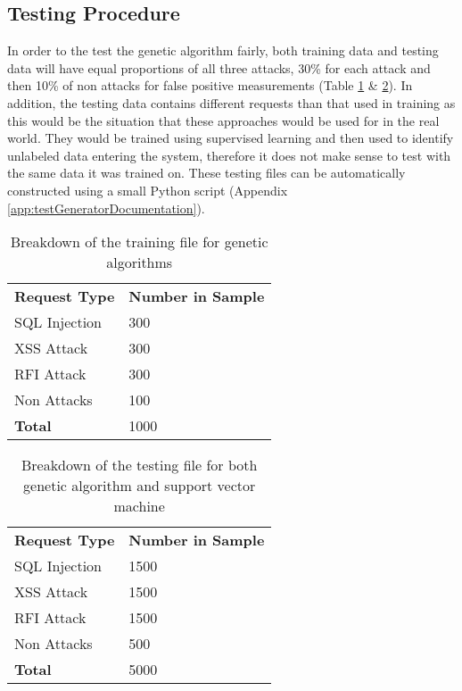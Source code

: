 \subsection{Testing Procedure}

In order to the test the genetic algorithm fairly, both training data and testing data will have equal proportions of all three attacks, 30\% for each attack and then 10\% of non attacks for false positive measurements (Table \ref{tab:trainingfile} \& \ref{tab:testfile}).  In addition, the testing data contains different requests than that used in training as this would be the situation that these approaches would be used for in the real world.  They would be trained using supervised learning and then used to identify unlabeled data entering the system, therefore it does not make sense to test with the same data it was trained on.  These testing files can be automatically constructed using a small Python script (Appendix \ref{app:testGeneratorDocumentation}).

\begin{table}
	\centering
	\begin{tabular}{|p{1.5in}|p{2.0in}|}
	\hline
		\textbf{Request Type} & \textbf{Number in Sample}\\
	\hhline{|=|=|}
		SQL Injection & 300 \\
	\hline
		XSS Attack & 300 \\
	\hline
		RFI Attack & 300 \\
	\hline
		Non Attacks & 100 \\
	\hhline{|=|=|}
		\textbf{Total} & 1000 \\
	\hline
	\end{tabular}
	\caption{Breakdown of the training file for genetic algorithms}
	\label{tab:trainingfile}
\end{table}	
	
\begin{table}
	\centering
	\begin{tabular}{|p{1.5in}|p{2.0in}|}
	\hline
		\textbf{Request Type} & \textbf{Number in Sample}\\
	\hhline{|=|=|}
		SQL Injection & 1500 \\
	\hline
		XSS Attack & 1500 \\
	\hline
		RFI Attack & 1500 \\
	\hline
		Non Attacks & 500 \\
	\hhline{|=|=|}
		\textbf{Total} & 5000 \\
	\hline
	\end{tabular}
	\caption{Breakdown of the testing file for both genetic algorithm and support vector machine}
	\label{tab:testfile}
\end{table}	

